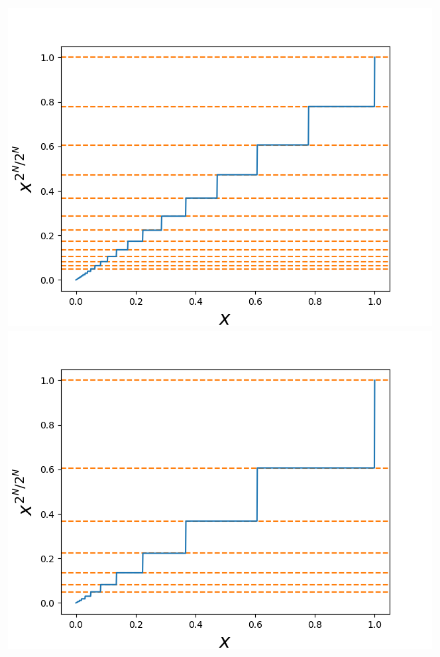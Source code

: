 \documentclass[11pt]{article}
\numberwithin{equation}{section} %
\begin{document}
\begin{figure}[!htp]
  \begin{minipage}[b]{0.5\linewidth}
    \centering
    \includegraphics[width=\linewidth]{p6_51.png}
  \end{minipage}%
  \begin{minipage}[b]{0.5\linewidth}
    \centering
    \includegraphics[width=\linewidth]{p6_52.png}
  \end{minipage}\\
  \begin{minipage}[b]{0.5\linewidth}
    \centering

\end{minipage}
\end{figure}
\end{document}
